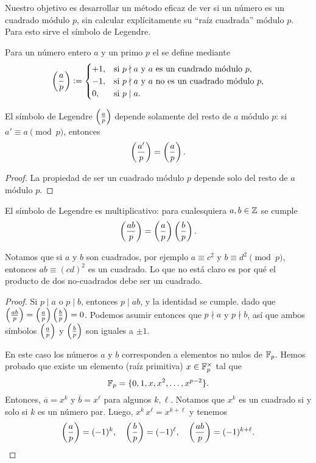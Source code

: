 \documentclass{article}
\theoremstyle{plain}
\begin{document}
Nuestro objetivo es desarrollar un método eficaz de ver si un número es un
cuadrado módulo $p$, sin calcular explícitamente su ``raíz cuadrada'' módulo
$p$. Para esto sirve el símbolo de Legendre.

\begin{definicion}
  Para un número entero $a$ y un primo $p$ el  se
  define mediante
  $$\left(\frac{a}{p}\right) \mathrel{\mathop:}= \begin{cases}
    +1, & \text{si }p\nmid a\text{ y }a\text{ es un cuadrado módulo }p,\\
    -1, & \text{si }p\nmid a\text{ y }a\text{ no es un cuadrado módulo }p,\\
    0, & \text{si }p\mid a.
  \end{cases}$$
\end{definicion}

\begin{observacion}
  El símbolo de Legendre $\left(\frac{a}{p}\right)$ depende solamente del resto de $a$
  módulo $p$: si $a' \equiv a \pmod{p}$, entonces
  $$\left(\frac{a'}{p}\right) = \left(\frac{a}{p}\right).$$

\begin{proof}
  La propiedad de ser un cuadrado módulo $p$ depende solo del resto de $a$
  módulo $p$.
\end{proof}
\end{observacion}

\begin{proposicion}
  El símbolo de Legendre es multiplicativo: para cualesquiera $a,b\in \mathbb{Z}$ se
  cumple
  $$\left(\frac{ab}{p}\right) = \left(\frac{a}{p}\right)\left(\frac{b}{p}\right).$$
\end{proposicion}

Notamos que si $a$ y $b$ son cuadrados, por ejemplo $a \equiv c^2$ y
$b \equiv d^2 \pmod{p}$, entonces $ab \equiv (cd)^2$ es un cuadrado. Lo que no
está claro es por qué el producto de dos no-cuadrados debe ser un cuadrado.

\begin{proof}
  Si $p \mid a$ o $p\mid b$, entonces $p \mid ab$, y la identidad se
  cumple. dado que
  $\left(\frac{ab}{p}\right) = \left(\frac{a}{p}\right)\left(\frac{b}{p}\right) = 0$. Podemos asumir
  entonces que $p \nmid a$ y $p \nmid b$, así que ambos símbolos
  $\left(\frac{a}{p}\right)$ y $\left(\frac{b}{p}\right)$ son iguales a $\pm 1$.

  En este caso los números $a$ y $b$ corresponden a elementos no nulos de
  $\mathbb{F}_p$. Hemos probado que existe un elemento (raíz primitiva)
  $x \in \mathbb{F}_p^\times$ tal que
  $$\mathbb{F}_p = \{ 0, 1, x, x^2, \ldots, x^{p-2} \}.$$
  Entonces, $\overline{a} = x^k$ y $\overline{b} = x^\ell$ para algunos
  $k,\ell$. Notamos que $x^k$ es un cuadrado si y solo si $k$ es un número
  par. Luego, $x^k\,x^\ell = x^{k+\ell}$ y tenemos
  \[ \left(\frac{a}{p}\right) = (-1)^k, \quad \left(\frac{b}{p}\right) = (-1)^\ell, \quad
     \left(\frac{ab}{p}\right) = (-1)^{k+\ell}. \qedhere \]
\end{proof}
\end{document}
